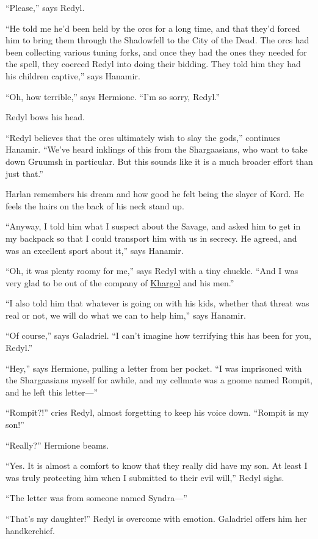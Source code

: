 \documentclass[smalldemyvopaper,11pt,twoside,onecolumn,openright,extrafontsizes]{memoir}
\begin{document}
``Please,'' says Redyl.

``He told me he'd been held by the orcs for a long time, and that they'd
forced him to bring them through the Shadowfell to the City of the Dead.
The orcs had been collecting various tuning forks, and once they had the
ones they needed for the spell, they coerced Redyl into doing their
bidding. They told him they had his children captive,'' says Hanamir.

``Oh, how terrible,'' says Hermione. ``I'm so sorry, Redyl.''

Redyl bows his head.

``Redyl believes that the orcs ultimately wish to slay the gods,''
continues Hanamir. ``We've heard inklings of this from the Shargaasians,
who want to take down Gruumsh in particular. But this sounds like it is
a much broader effort than just that.''

Harlan remembers his dream and how good he felt being the slayer of
Kord. He feels the hairs on the back of his neck stand up.

``Anyway, I told him what I suspect about the Savage, and asked him to
get in my backpack so that I could transport him with us in secrecy. He
agreed, and was an excellent sport about it,'' says Hanamir.

``Oh, it was plenty roomy for me,'' says Redyl with a tiny chuckle.
``And I was very glad to be out of the company of
\href{/characters/khargol/}{Khargol} and his men.''

``I also told him that whatever is going on with his kids, whether that
threat was real or not, we will do what we can to help him,'' says
Hanamir.

``Of course,'' says Galadriel. ``I can't imagine how terrifying this has
been for you, Redyl.''

``Hey,'' says Hermione, pulling a letter from her pocket. ``I was
imprisoned with the Shargaasians myself for awhile, and my cellmate was
a gnome named Rompit, and he left this letter---''

``Rompit?!'' cries Redyl, almost forgetting to keep his voice down.
``Rompit is my son!''

``Really?'' Hermione beams.

``Yes. It is almost a comfort to know that they really did have my son.
At least I was truly protecting him when I submitted to their evil
will,'' Redyl sighs.

``The letter was from someone named Syndra---''

``That's my daughter!'' Redyl is overcome with emotion. Galadriel offers
him her handkerchief.
\end{document}
